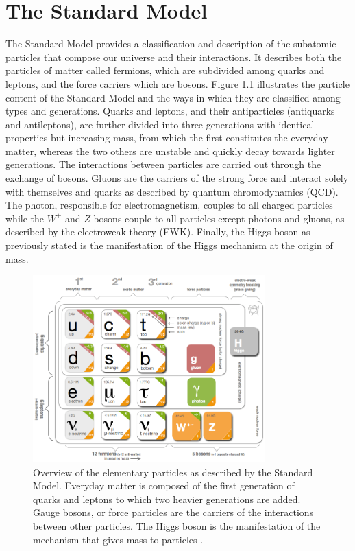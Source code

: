 \chapter{The Standard Model}
\label{chap:I-1-standard-model}

  The Standard Model provides a classification and description of the subatomic particles that compose our universe and their interactions. It describes both the particles of matter called fermions, which are subdivided among quarks and leptons, and the force carriers which are bosons. Figure \ref{fig:I-1-sm-particles} illustrates the particle content of the Standard Model and the ways in which they are classified among types and generations. Quarks and leptons, and their antiparticles (antiquarks and antileptons), are further divided into three generations with identical properties but increasing mass, from which the first constitutes the everyday matter, whereas the two others are unstable and quickly decay towards lighter generations. The interactions between particles are carried out through the exchange of bosons. Gluons are the carriers of the strong force and interact solely with themselves and quarks as described by quantum chromodynamics (QCD). The photon, responsible for electromagnetism, couples to all charged particles while the $ W^\pm $ and $ Z $ bosons couple to all particles except photons and gluons, as described by the electroweak theory (EWK). Finally, the Higgs boson as previously stated is the manifestation of the Higgs mechanism at the origin of mass. \\

	\begin{figure}[h!]
		\centering
		\includegraphics[width=0.8\textwidth]{img/I-1-standard-model/sm-particles.png}
		\caption{Overview of the elementary particles as described by the Standard Model. Everyday matter is composed of the first generation of quarks and leptons to which two heavier generations are added. Gauge bosons, or force particles are the carriers of the interactions between other particles. The Higgs boson is the manifestation of the mechanism that gives mass to particles \cite{HOME-CERN}.}
		\label{fig:I-1-sm-particles}
	\end{figure}

